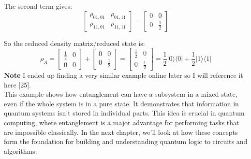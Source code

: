 \noindent The second term gives:
\[
\begin{bmatrix}
\rho_{01,01} & \rho_{01,11} \\
\rho_{11,01} & \rho_{11,11}
\end{bmatrix}
=
\begin{bmatrix}
0 & 0 \\
0 & \frac{1}{2}
\end{bmatrix}
\]

\noindent So the reduced density matrix/reduced state is:
\[
\rho_A =
\begin{bmatrix}
\frac{1}{2} & 0 \\
0 & 0
\end{bmatrix}
+
\begin{bmatrix}
0 & 0 \\
0 & \frac{1}{2}
\end{bmatrix}
=
\begin{bmatrix}
\frac{1}{2} & 0 \\
0 & \frac{1}{2}
\end{bmatrix}
=
\frac{1}{2} |0\rangle \langle 0| + \frac{1}{2} |1\rangle \langle 1|
\]
\noindent \textbf{Note} I ended up finding a very similar example online later so I will reference it here [25].\\

\noindent
This example shows how entanglement can have a subsystem in a mixed state, even if the whole system is in a pure state. It demonstrates that information in quantum systems isn't stored in individual parts. This idea is crucial in quantum computing, where entanglement is a major advantage for performing tasks that are impossible classically. In the next chapter, we’ll look at how these concepts form the foundation for building and understanding quantum logic to circuits and algorithms.

